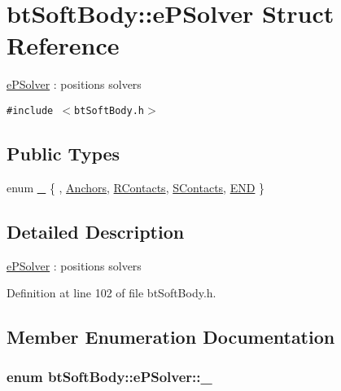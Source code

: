 \hypertarget{structbt_soft_body_1_1e_p_solver}{
\section{btSoftBody::ePSolver Struct Reference}
\label{structbt_soft_body_1_1e_p_solver}
}
\hyperlink{structbt_soft_body_1_1e_p_solver}{ePSolver} : positions solvers  


{\tt \#include $<$btSoftBody.h$>$}

\subsection*{Public Types}
\begin{CompactItemize}
\item 
enum \hyperlink{structbt_soft_body_1_1e_p_solver_5d6ab41a09da7333bc2047b4ea14bf86}{\_\-} \{ , \hyperlink{structbt_soft_body_1_1e_p_solver_5d6ab41a09da7333bc2047b4ea14bf86d1de203597e3f891a95c3aaf4f805e84}{Anchors}, 
\hyperlink{structbt_soft_body_1_1e_p_solver_5d6ab41a09da7333bc2047b4ea14bf8618826149c80118f73e906b4966c69891}{RContacts}, 
\hyperlink{structbt_soft_body_1_1e_p_solver_5d6ab41a09da7333bc2047b4ea14bf861ff50fff0983fbc2e4ae19997d7bfb4e}{SContacts}, 
\hyperlink{structbt_soft_body_1_1e_p_solver_5d6ab41a09da7333bc2047b4ea14bf86f5b5c91f8cb6d3d29ee7bb11e1ce5610}{END}
 \}
\end{CompactItemize}


\subsection{Detailed Description}
\hyperlink{structbt_soft_body_1_1e_p_solver}{ePSolver} : positions solvers 

Definition at line 102 of file btSoftBody.h.

\subsection{Member Enumeration Documentation}
\hypertarget{structbt_soft_body_1_1e_p_solver_5d6ab41a09da7333bc2047b4ea14bf86}{
\subsubsection[\_\-]{\setlength{\rightskip}{0pt plus 5cm}enum {\bf btSoftBody::ePSolver::\_\-}}}
\label{structbt_soft_body_1_1e_p_solver_5d6ab41a09da7333bc2047b4ea14bf86}


